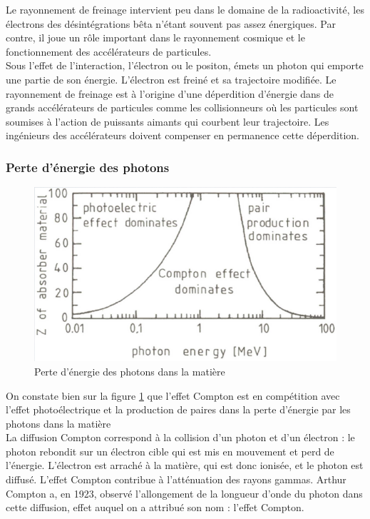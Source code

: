 Le rayonnement de freinage intervient peu dans le domaine de la radioactivité, les électrons des désintégrations bêta n'étant souvent pas assez énergiques. Par contre, il joue un rôle important dans le rayonnement cosmique et le fonctionnement des accélérateurs de particules. \\

Sous l’effet de l’interaction, l’électron ou le positon, émets un photon qui emporte une partie de son énergie. L’électron est freiné et sa trajectoire modifiée. Le rayonnement de freinage est à l’origine d’une déperdition d’énergie dans de grands accélérateurs de particules comme les collisionneurs où les particules sont soumises à l’action de puissants aimants qui courbent leur trajectoire. Les ingénieurs des accélérateurs doivent compenser en permanence cette déperdition.

\subsubsection{Perte d'énergie des photons}
\begin{figure}[ht]
    \centering
    \includegraphics[scale=0.60]{Images1/pertephotons.PNG}
    \caption{Perte d'énergie des photons dans la matière}
    \label{fig:pertes_energie_photos}
\end{figure}
On constate bien sur la figure \ref{fig:pertes_energie_photos} que l'effet Compton est en compétition avec l'effet photoélectrique et la production de paires dans la perte d'énergie par les photons dans la matière\\

La diffusion Compton correspond à la collision d’un photon et d’un électron : le photon rebondit sur un électron cible qui est mis en mouvement et perd de l’énergie. L'électron est arraché à la matière, qui est donc ionisée, et le photon est diffusé. L'effet Compton contribue à l'atténuation des rayons gammas.  Arthur Compton a, en 1923, observé l'allongement de la longueur d'onde du photon dans cette diffusion, effet auquel on a attribué son nom : l'effet Compton.

